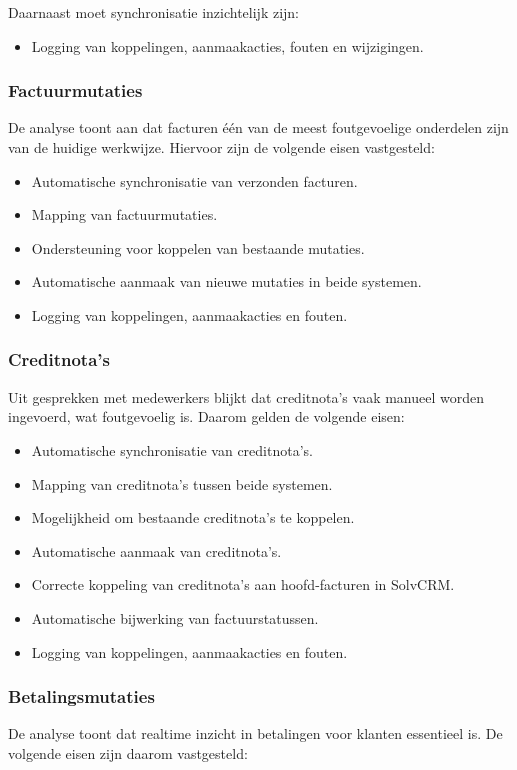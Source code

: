 Daarnaast moet synchronisatie inzichtelijk zijn:
\begin{itemize}
    \item Logging van koppelingen, aanmaakacties, fouten en wijzigingen.
\end{itemize}

\subsubsection*{Factuurmutaties}
De analyse toont aan dat facturen één van de meest foutgevoelige onderdelen zijn van de huidige werkwijze. Hiervoor zijn de volgende eisen vastgesteld:

\begin{itemize}
    \item Automatische synchronisatie van verzonden facturen.
    \item Mapping van factuurmutaties.
    \item Ondersteuning voor koppelen van bestaande mutaties.
    \item Automatische aanmaak van nieuwe mutaties in beide systemen.
    \item Logging van koppelingen, aanmaakacties en fouten.
\end{itemize}

\subsubsection*{Creditnota's}
Uit gesprekken met medewerkers blijkt dat creditnota’s vaak manueel worden ingevoerd, wat foutgevoelig is. Daarom gelden de volgende eisen:

\begin{itemize}
    \item Automatische synchronisatie van creditnota’s.
    \item Mapping van creditnota’s tussen beide systemen.
    \item Mogelijkheid om bestaande creditnota’s te koppelen.
    \item Automatische aanmaak van creditnota’s.
    \item Correcte koppeling van creditnota’s aan hoofd-facturen in SolvCRM.
    \item Automatische bijwerking van factuurstatussen.
    \item Logging van koppelingen, aanmaakacties en fouten.
\end{itemize}

\subsubsection*{Betalingsmutaties}
De analyse toont dat realtime inzicht in betalingen voor klanten essentieel is. De volgende eisen zijn daarom vastgesteld:

